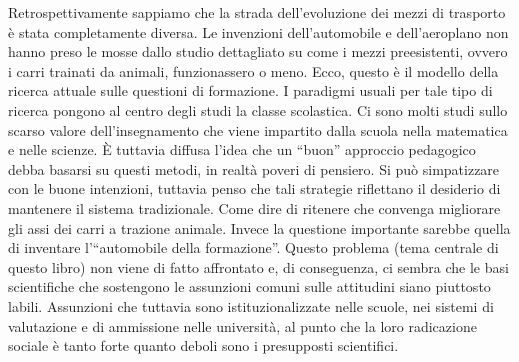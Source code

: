 Retrospettivamente sappiamo che la strada dell'evoluzione dei mezzi di trasporto è stata completamente diversa. Le invenzioni dell'automobile e dell'aeroplano non hanno preso le mosse dallo studio dettagliato su come i mezzi preesistenti, ovvero i carri trainati da animali, funzionassero o meno.  Ecco, questo è il  modello della ricerca attuale sulle questioni di formazione. I paradigmi usuali per tale tipo di ricerca pongono al centro degli  studi  la classe scolastica. Ci sono molti studi sullo scarso valore dell'insegnamento che viene impartito dalla scuola nella matematica e nelle scienze. È tuttavia diffusa l'idea che un “buon” approccio pedagogico debba basarsi su questi metodi, in realtà poveri di pensiero. Si può simpatizzare con le buone intenzioni, tuttavia penso che tali strategie riflettano il desiderio di mantenere il sistema tradizionale. Come dire di ritenere che convenga migliorare gli assi dei carri a trazione animale. Invece la questione importante sarebbe quella di inventare l'“automobile della formazione”. Questo problema (tema centrale di questo libro) non viene di fatto affrontato e, di conseguenza, ci sembra che le basi scientifiche che sostengono le assunzioni comuni sulle attitudini siano piuttosto labili. Assunzioni che tuttavia sono istituzionalizzate nelle scuole, nei sistemi di valutazione e di ammissione nelle università, al punto che la loro radicazione sociale è tanto forte quanto deboli sono i presupposti scientifici. 

